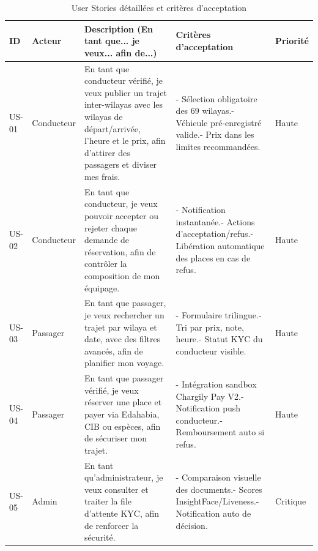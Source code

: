 \begin{table}[H]
\centering
\small
\begin{tabularx}{\textwidth}{|l|l|X|X|l|}
\hline
\rowcolor{rohlight}
\textbf{ID} & \textbf{Acteur} & \textbf{Description (En tant que... je veux... afin de...)} & \textbf{Critères d'acceptation} & \textbf{Priorité} \\
\hline
US-01 & Conducteur & En tant que conducteur vérifié, je veux publier un trajet inter-wilayas avec les wilayas de départ/arrivée, l'heure et le prix, afin d'attirer des passagers et diviser mes frais. & - Sélection obligatoire des 69 wilayas.\newline - Véhicule pré-enregistré valide.\newline - Prix dans les limites recommandées. & Haute \\
\hline
US-02 & Conducteur & En tant que conducteur, je veux pouvoir accepter ou rejeter chaque demande de réservation, afin de contrôler la composition de mon équipage. & - Notification instantanée.\newline - Actions d'acceptation/refus.\newline - Libération automatique des places en cas de refus. & Haute \\
\hline
US-03 & Passager & En tant que passager, je veux rechercher un trajet par wilaya et date, avec des filtres avancés, afin de planifier mon voyage. & - Formulaire trilingue.\newline - Tri par prix, note, heure.\newline - Statut KYC du conducteur visible. & Haute \\
\hline
US-04 & Passager & En tant que passager vérifié, je veux réserver une place et payer via Edahabia, CIB ou espèces, afin de sécuriser mon trajet. & - Intégration sandbox Chargily Pay V2.\newline - Notification push conducteur.\newline - Remboursement auto si refus. & Haute \\
\hline
US-05 & Admin & En tant qu'administrateur, je veux consulter et traiter la file d'attente KYC, afin de renforcer la sécurité. & - Comparaison visuelle des documents.\newline - Scores InsightFace/Liveness.\newline - Notification auto de décision. & Critique \\
\hline
\end{tabularx}
\caption{User Stories détaillées et critères d'acceptation}
\label{tab:user-stories}
\end{table}

